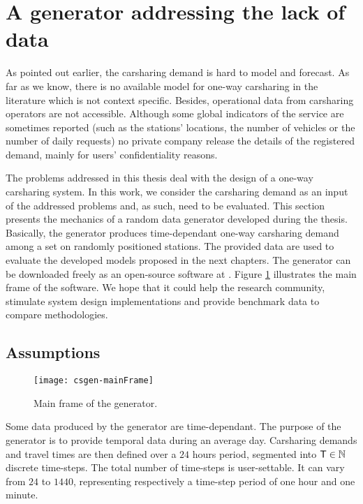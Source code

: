 \section{A generator addressing the lack of data} \label{csgeneratorDescription}

As pointed out earlier, the carsharing demand is hard to model and forecast.
As far as we know, there is no available model for one-way carsharing in the literature which is not context specific.
Besides, operational data from carsharing operators are not accessible.
Although some global indicators of the service are sometimes reported (such as the stations' locations, the number of vehicles or the number of daily requests) no private company release the details of the registered demand, mainly for users' confidentiality reasons.

\medskip
The problems addressed in this thesis deal with the design of a one-way carsharing system.
In this work, we consider the carsharing demand as an input of the addressed problems and, as such, need to be evaluated.
This section presents the mechanics of a random data generator developed during the thesis.
Basically, the generator produces time-dependant one-way carsharing demand among a set on randomly positioned stations.
The provided data are used to evaluate the developed models proposed in the next chapters.
The generator can be downloaded freely as an open-source software at \cite{csgen}.
Figure \ref{fig:csgen-mainFrame} illustrates the main frame of the software.
We hope that it could help the research community, stimulate system design implementations and provide benchmark data to compare methodologies.


\subsection{Assumptions}

\begin{figure}[!h]
\centering
\texttt{[image: csgen-mainFrame]}
\caption{Main frame of the generator.}
\label{fig:csgen-mainFrame}
\end{figure}

Some data produced by the generator are time-dependant.
The purpose of the generator is to provide temporal data during an average day.
Carsharing demands and travel times are then defined over a $24$ hours period, segmented into $\mathsf{T} \in \mathbb{N}$ discrete time-steps.
The total number of time-steps is user-settable.
It can vary from $24$ to $1440$, representing respectively a time-step period of one hour and one minute.

